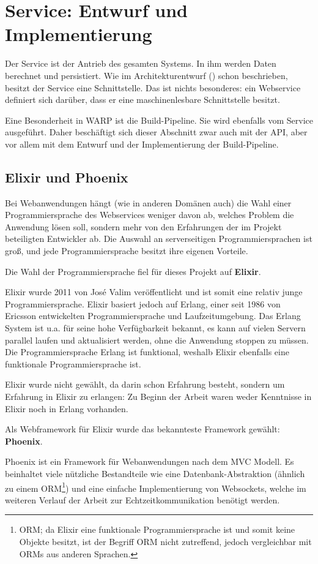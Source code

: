 \section{Service: Entwurf und Implementierung}

Der Service ist der Antrieb des gesamten Systems. In ihm werden Daten berechnet und persistiert. Wie im Architekturentwurf () schon beschrieben, besitzt der Service eine Schnittstelle. Das ist nichts besonderes: ein Webservice definiert sich darüber, dass er eine maschinenlesbare Schnittstelle besitzt.

Eine Besonderheit in WARP ist die Build-Pipeline. Sie wird ebenfalls vom Service ausgeführt. Daher beschäftigt sich dieser Abschnitt zwar auch mit der API, aber vor allem mit dem Entwurf und der Implementierung der Build-Pipeline.

\subsection{Elixir und Phoenix}

Bei Webanwendungen hängt (wie in anderen Domänen auch) die Wahl einer Programmiersprache des Webservices weniger davon ab, welches Problem die Anwendung lösen soll, sondern mehr von den Erfahrungen der im Projekt beteiligten Entwickler ab. Die Auswahl an serverseitigen Programmiersprachen ist groß, und jede Programmiersprache besitzt ihre eigenen Vorteile.

Die Wahl der Programmiersprache fiel für dieses Projekt auf \textbf{Elixir}.

Elixir wurde 2011 von José Valim veröffentlicht und ist somit eine relativ junge Programmiersprache. Elixir basiert jedoch auf Erlang, einer seit 1986 von Ericsson entwickelten Programmiersprache und Laufzeitumgebung. Das Erlang System ist u.a. für seine hohe Verfügbarkeit bekannt, es kann auf vielen Servern parallel laufen und aktualisiert werden, ohne die Anwendung stoppen zu müssen. Die Programmiersprache Erlang ist funktional, weshalb Elixir ebenfalls eine funktionale Programmiersprache ist.

Elixir wurde nicht gewählt, da darin schon Erfahrung besteht, sondern um Erfahrung in Elixir zu erlangen: Zu Beginn der Arbeit waren weder Kenntnisse in Elixir noch in Erlang vorhanden.

Als Webframework für Elixir wurde das bekannteste Framework gewählt: \textbf{Phoenix}.

Phoenix ist ein Framework für Webanwendungen nach dem \ac{MVC} Modell. Es beinhaltet viele nützliche Bestandteile wie eine Datenbank-Abstraktion (ähnlich zu einem \acs{ORM}\footnote{\acf{ORM}; da Elixir eine funktionale Programmiersprache ist und somit keine Objekte besitzt, ist der Begriff \acs{ORM} nicht zutreffend, jedoch vergleichbar mit ORMs aus anderen Sprachen.}) und eine einfache Implementierung von Websockets, welche im weiteren Verlauf der Arbeit zur Echtzeitkommunikation benötigt werden.

